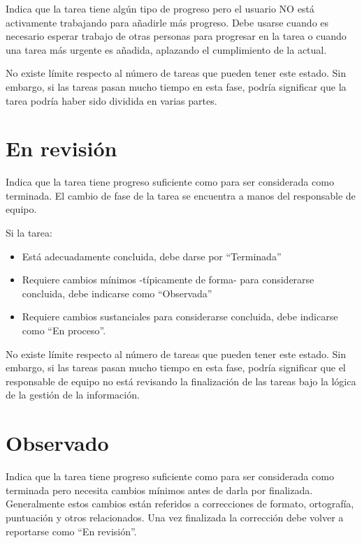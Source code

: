 \documentclass[
  letterpaper,
  DIV=11,
  numbers=noendperiod]{scrreprt}
\providecommand{\tightlist}{%
  \setlength{\itemsep}{0pt}\setlength{\parskip}{0pt}}\usepackage{longtable,booktabs,array}
\begin{document}
Indica que la tarea tiene algún tipo de progreso pero el usuario NO está
activamente trabajando para añadirle más progreso. Debe usarse cuando es
necesario esperar trabajo de otras personas para progresar en la tarea o
cuando una tarea más urgente es añadida, aplazando el cumplimiento de la
actual.

No existe límite respecto al número de tareas que pueden tener este
estado. Sin embargo, si las tareas pasan mucho tiempo en esta fase,
podría significar que la tarea podría haber sido dividida en varias
partes.

\hypertarget{en-revisiuxf3n}{%
\section{En revisión}\label{en-revisiuxf3n}}

Indica que la tarea tiene progreso suficiente como para ser considerada
como terminada. El cambio de fase de la tarea se encuentra a manos del
responsable de equipo.

Si la tarea:

\begin{itemize}
\tightlist
\item
  Está adecuadamente concluida, debe darse por ``Terminada''
\item
  Requiere cambios mínimos -típicamente de forma- para considerarse
  concluida, debe indicarse como ``Observada''
\item
  Requiere cambios sustanciales para considerarse concluida, debe
  indicarse como ``En proceso''.
\end{itemize}

No existe límite respecto al número de tareas que pueden tener este
estado. Sin embargo, si las tareas pasan mucho tiempo en esta fase,
podría significar que el responsable de equipo no está revisando la
finalización de las tareas bajo la lógica de la gestión de la
información.

\hypertarget{observado}{%
\section{Observado}\label{observado}}

Indica que la tarea tiene progreso suficiente como para ser considerada
como terminada pero necesita cambios mínimos antes de darla por
finalizada. Generalmente estos cambios están referidos a correcciones de
formato, ortografía, puntuación y otros relacionados. Una vez finalizada
la corrección debe volver a reportarse como ``En revisión''.
\end{document}
